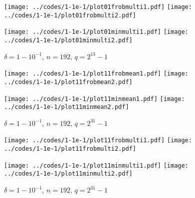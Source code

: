 \documentclass[supplement,hidelinks,onefignum,onetabnum]{siamart220329}
\begin{document}
\begin{figure}
\begin{centering}
{\texttt{[image: ../codes/1-1e-1/plot01frobmulti1.pdf]}}
{\texttt{[image: ../codes/1-1e-1/plot01frobmulti2.pdf]}}

{\texttt{[image: ../codes/1-1e-1/plot01minmulti1.pdf]}}
{\texttt{[image: ../codes/1-1e-1/plot01minmulti2.pdf]}}

\end{centering}
\caption{$\delta = 1-10^{-1}$, $n = 192$, $q = 2^{13} - 1$}
\end{figure}

\begin{figure}
\begin{centering}
{\texttt{[image: ../codes/1-1e-1/plot11frobmean1.pdf]}}
{\texttt{[image: ../codes/1-1e-1/plot11frobmean2.pdf]}}

{\texttt{[image: ../codes/1-1e-1/plot11minmean1.pdf]}}
{\texttt{[image: ../codes/1-1e-1/plot11minmean2.pdf]}}

\end{centering}
\caption{$\delta = 1-10^{-1}$, $n = 192$, $q = 2^{31} - 1$}
\end{figure}

\begin{figure}
\begin{centering}
{\texttt{[image: ../codes/1-1e-1/plot11frobmulti1.pdf]}}
{\texttt{[image: ../codes/1-1e-1/plot11frobmulti2.pdf]}}

{\texttt{[image: ../codes/1-1e-1/plot11minmulti1.pdf]}}
{\texttt{[image: ../codes/1-1e-1/plot11minmulti2.pdf]}}

\end{centering}
\caption{$\delta = 1-10^{-1}$, $n = 192$, $q = 2^{31} - 1$}
\label{pserr1-1e-1-31}
\end{figure}



\clearpage





\end{document}
